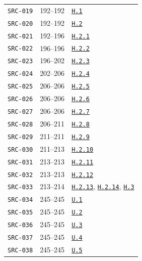 \documentclass[12pt,letterpaper]{article}
\newcommand{\stepref}[1]{\hyperref[step:#1]{\texttt{#1}}}
\begin{document}
\begin{longtable}{p{.19\linewidth}p{.22\linewidth}p{.48\linewidth}}
\texttt{SRC-019} & 192--192 & \stepref{H.1} \\

\texttt{SRC-020} & 192--192 & \stepref{H.2} \\

\texttt{SRC-021} & 192--196 & \stepref{H.2.1} \\

\texttt{SRC-022} & 196--196 & \stepref{H.2.2} \\

\texttt{SRC-023} & 196--202 & \stepref{H.2.3} \\

\texttt{SRC-024} & 202--206 & \stepref{H.2.4} \\

\texttt{SRC-025} & 206--206 & \stepref{H.2.5} \\

\texttt{SRC-026} & 206--206 & \stepref{H.2.6} \\

\texttt{SRC-027} & 206--206 & \stepref{H.2.7} \\

\texttt{SRC-028} & 206--211 & \stepref{H.2.8} \\

\texttt{SRC-029} & 211--211 & \stepref{H.2.9} \\

\texttt{SRC-030} & 211--213 & \stepref{H.2.10} \\

\texttt{SRC-031} & 213--213 & \stepref{H.2.11} \\

\texttt{SRC-032} & 213--213 & \stepref{H.2.12} \\

\texttt{SRC-033} & 213--214 & \stepref{H.2.13}, \stepref{H.2.14}, \stepref{H.3} \\

\texttt{SRC-034} & 245--245 & \stepref{U.1} \\

\texttt{SRC-035} & 245--245 & \stepref{U.2} \\

\texttt{SRC-036} & 245--245 & \stepref{U.3} \\

\texttt{SRC-037} & 245--245 & \stepref{U.4} \\

\texttt{SRC-038} & 245--245 & \stepref{U.5} \\


\end{longtable}
\end{document}
